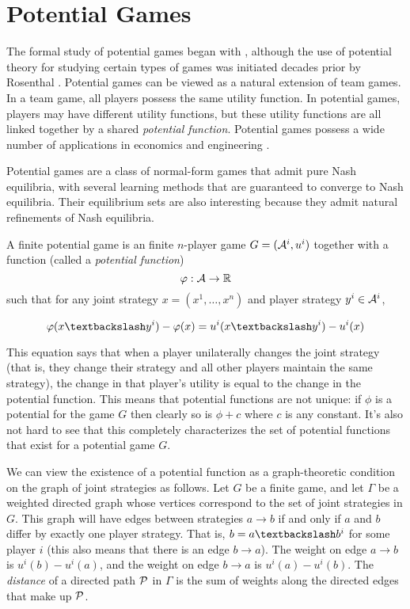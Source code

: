 \section{Potential Games}

The formal study of potential games began with \cite{monderer1996potential}, although the use of potential theory for studying certain types of games was initiated decades prior by Rosenthal \cite{rosenthal1973class}. Potential games can be viewed as a natural extension of team games. In a team game, all players possess the same utility function. In potential games, players may have different utility functions, but these utility functions are all linked together by a shared {\em potential function}. Potential games possess a wide number of applications in economics and engineering \cite{buzzi2011potential, cheng2014finite, li2013designing, marden2007connections, saad2012game, scutari2006potential, soto2009distributed, sandholm2001potential}. 

Potential games are a class of normal-form games that admit pure Nash equilibria, with several learning methods that are guaranteed to converge to Nash equilibria. Their equilibrium sets are also interesting because they admit natural refinements of Nash equilibria.

\begin{mydef}
A finite potential game is an finite $n$-player game $G = (\AA^i, u^i)$ together with a function (called a {\em potential function}) 
$$
\phi: \AA \rightarrow \R
$$
 such that for any joint strategy $x = (x^1, \ldots, x^n)$ and player strategy $y^i \in \AA^i$,

$$
\phi(\asub{x}{y^i}) - \phi(x) = u^i(\asub{x}{y^i}) - u^i(x)
$$
\end{mydef}


This equation says that when a player unilaterally changes the joint strategy (that is, they change their strategy and all other players maintain the same strategy), the change in that player's utility is equal to the change in the potential function. This means that potential functions are not unique: if $\phi$ is a potential for the game $G$ then clearly so is $\phi + c$ where $c$ is any constant. It's also not hard to see that this completely characterizes the set of potential functions that exist for a potential game $G$. 

We can view the existence of a potential function as a graph-theoretic condition on the graph of joint strategies as follows. Let $G$ be a finite game, and let $\Gamma$ be a weighted directed graph whose vertices correspond to the set of joint strategies in $G$. This graph will have edges between strategies $a \rightarrow b$ if and only if $a$ and $b$ differ by exactly one player strategy. That is, $b = \asub{a}{b^i}$ for some player $i$ (this also means that there is an edge $b \rightarrow a$). The weight on edge $a \rightarrow b$ is $u^i(b) - u^i(a)$, and the weight on edge $b \rightarrow a$ is $u^i(a) - u^i(b)$. The {\em distance} of a directed path $\PP$ in $\Gamma$ is the sum of weights along the directed edges that make up $\PP$. 

